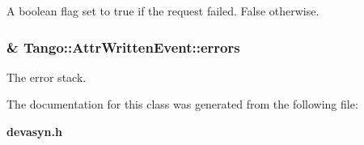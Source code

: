 A boolean flag set to true if the request failed. False otherwise. 

\subsubsection[{errors}]{\& Tango\-::\-Attr\-Written\-Event\-::errors}\label{classTango_1_1AttrWrittenEvent_ab66070e56148e1aed6c9e5125af2c8dd}


The error stack. 



The documentation for this class was generated from the following file\-:\begin{DoxyCompactItemize}
\item 
{\bf devasyn.\-h}\end{DoxyCompactItemize}
